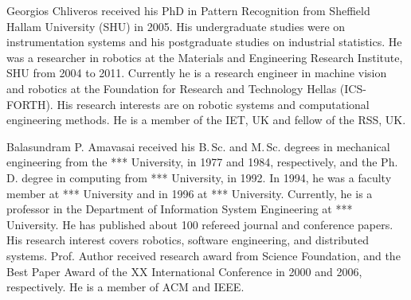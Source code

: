 \documentclass[10pt,journal,compsoc]{joser1}
\begin{document}
\begin{IEEEbiography}[{wedekind_20131110_f05}]{Georgios Chliveros}
received his PhD in Pattern Recognition from Sheffield Hallam University (SHU)
in 2005. His undergraduate studies were on instrumentation systems and
his postgraduate studies on industrial statistics.
He was a researcher in robotics at the Materials and Engineering Research Institute, SHU
from 2004 to 2011. Currently he is a research engineer in machine vision and robotics at
the Foundation for Research and Technology Hellas (ICS-FORTH).
His research interests are on robotic systems and
computational engineering methods.
He is a member of the IET, UK and fellow of the RSS, UK.
\end{IEEEbiography}

\begin{IEEEbiography}[{wedekind_20131110_f04}]{Balasundram P. Amavasai}
received his B.\,Sc. and
M.\,Sc. degrees in mechanical engineering from the *** University,
in 1977 and 1984, respectively, and the Ph.\,D. degree in
computing from *** University, in 1992. In 1994, he was a
faculty member at *** University and in 1996 at ***
University. Currently, he is a professor in the Department of
Information System Engineering at *** University.
He has published about 100 refereed journal and conference papers.
His research interest covers robotics, software engineering, and distributed
systems.
Prof. Author received research award from Science Foundation, and
the Best Paper Award of the XX International Conference in 2000 and
2006, respectively. He is a member of ACM and IEEE.
\end{IEEEbiography}



\vfill


\end{document}
